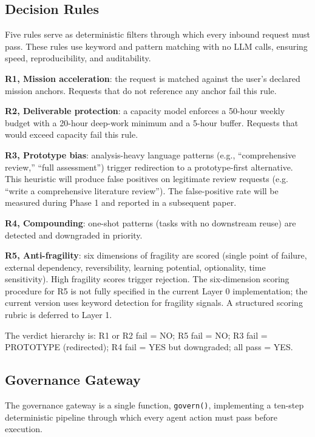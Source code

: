 \documentclass[11pt,a4paper]{article}
\begin{document}
\subsection{Decision Rules}

Five rules serve as deterministic filters through which every inbound request must pass. These rules use keyword and pattern matching with no LLM calls, ensuring speed, reproducibility, and auditability.

\textbf{R1, Mission acceleration}: the request is matched against the user's declared mission anchors. Requests that do not reference any anchor fail this rule.

\textbf{R2, Deliverable protection}: a capacity model enforces a 50-hour weekly budget with a 20-hour deep-work minimum and a 5-hour buffer. Requests that would exceed capacity fail this rule.

\textbf{R3, Prototype bias}: analysis-heavy language patterns (e.g., ``comprehensive review,'' ``full assessment'') trigger redirection to a prototype-first alternative. This heuristic will produce false positives on legitimate review requests (e.g. ``write a comprehensive literature review''). The false-positive rate will be measured during Phase 1 and reported in a subsequent paper.

\textbf{R4, Compounding}: one-shot patterns (tasks with no downstream reuse) are detected and downgraded in priority.

\textbf{R5, Anti-fragility}: six dimensions of fragility are scored (single point of failure, external dependency, reversibility, learning potential, optionality, time sensitivity). High fragility scores trigger rejection. The six-dimension scoring procedure for R5 is not fully specified in the current Layer 0 implementation; the current version uses keyword detection for fragility signals. A structured scoring rubric is deferred to Layer 1.

The verdict hierarchy is: R1 or R2 fail = NO; R5 fail = NO; R3 fail = PROTOTYPE (redirected); R4 fail = YES but downgraded; all pass = YES.

\subsection{Governance Gateway}

The governance gateway is a single function, \texttt{govern()}, implementing a ten-step deterministic pipeline through which every agent action must pass before execution.
\end{document}
